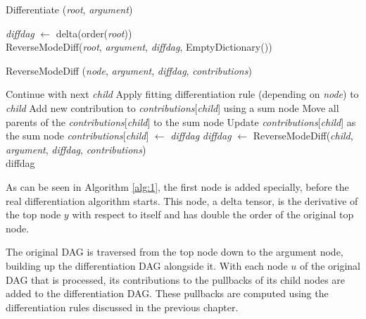 \documentclass[12pt, a4paper]{report}
\begin{document}
\begin{algorithm}
    \caption{Differentiate (\textit{root}, \textit{argument})}\label{alg:1}
    \begin{algorithmic}
        \State \textit{diffdag} $\gets$ delta(order(\textit{root}))  \\
        \Return ReverseModeDiff(\textit{root}, \textit{argument}, \textit{diffdag}, EmptyDictionary())
    \end{algorithmic}
\end{algorithm}

\begin{algorithm}
    \caption{ReverseModeDiff (\textit{node}, \textit{argument}, \textit{diffdag}, \textit{contributions})}\label{alg:2}
    \begin{algorithmic}
                \State Continue with next \textit{child}
            \EndIf
            \State Apply fitting differentiation rule (depending on \textit{node}) to \textit{child}
                \State Add new contribution to \textit{contributions}[\textit{child}] using a sum node
                \State Move all parents of the \textit{contributions}[\textit{child}] to the sum node
                \State Update \textit{contributions}[\textit{child}] as the sum node
            \Else
                \State \textit{contributions}[\textit{child}] $\gets$ \textit{diffdag}
                \State \textit{diffdag} $\gets$ ReverseModeDiff(\textit{child}, \textit{argument}, \textit{diffdag}, \textit{contributions})
            \EndIf
        \EndFor \\
        \Return diffdag
    \end{algorithmic}
\end{algorithm}

As can be seen in Algorithm \ref{alg:1}, the first node is added specially, before the real differentiation algorithm starts.
This node, a delta tensor, is the derivative of the top node $y$ with respect to itself and has double the order of the original top node.

The original DAG is traversed from the top node down to the argument node, building up the differentiation DAG alongside it.
With each node $u$ of the original DAG that is processed, its contributions to the pullbacks of its child nodes are added to the differentiation DAG.
These pullbacks are computed using the differentiation rules discussed in the previous chapter.
\end{document}
